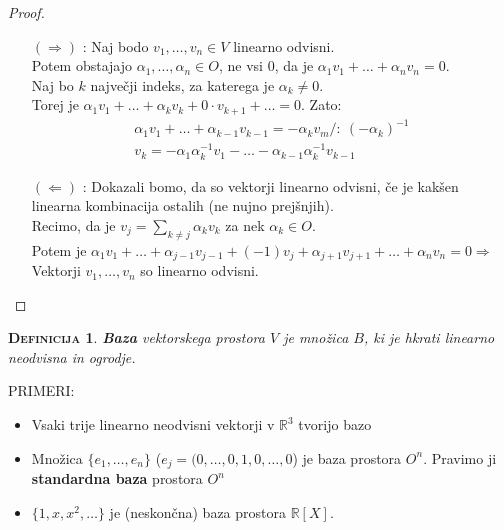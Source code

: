 \documentclass[a4paper,12pt]{article}
\newtheorem*{definicija}{\textsc{Definicija}}
\begin{document}
\begin{proof}~

\begin{itemize}
\item[$(\Rightarrow)$]:
Naj bodo $v_1,\ldots,v_n\in V$ linearno odvisni. \\

Potem obstajajo $\alpha_1,\ldots,\alpha_n\in O$, ne vsi 0, da je $\alpha_1v_1+\ldots+\alpha_nv_n=0$. \\

Naj bo $k$ največji indeks, za katerega je $\alpha_k\neq0$. \\

Torej je $\alpha_1v_1+\ldots+\alpha_kv_k+0\cdot v_{k+1}+\ldots=0$. Zato:
\begin{gather*}
\alpha_1v_1+\ldots+\alpha_{k-1}v_{k-1}=-\alpha_kv_m / :~(-\alpha_k)^{-1} \\
v_k=-\alpha_1\alpha_k^{-1}v_1-\ldots-\alpha_{k-1}\alpha_k^{-1}v_{k-1}
\end{gather*}
\item[$(\Leftarrow)$]:
Dokazali bomo, da so vektorji linearno odvisni, če je kakšen linearna kombinacija ostalih (ne nujno prejšnjih). \\

Recimo, da je $v_j=\sum_{k\neq j}\alpha_kv_k$ za nek $\alpha_k\in O$. \\

Potem je $\alpha_1v_1+\ldots+\alpha_{j-1}v_{j-1}+(-1)v_j+\alpha_{j+1}v_{j+1}+\ldots+\alpha_nv_n=0 \Rightarrow$ Vektorji $v_1,\ldots,v_n$ so linearno odvisni.
\end{itemize}
\end{proof}

\begin{definicija}
\textbf{Baza} vektorskega prostora $V$ je množica $B$, ki je hkrati linearno neodvisna in ogrodje.\\ 
\end{definicija}

\newpage 

\noindent PRIMERI:
\begin{itemize}
\item Vsaki trije linearno neodvisni vektorji v $\mathbb{R}^3$ tvorijo bazo
\item Množica $\{e_1,\ldots,e_n\}$ ($e_j=(0,\ldots,0,1,0,\ldots,0$) je baza prostora $O^n$. Pravimo ji \textbf{standardna baza} prostora $O^n$
\item $\{1,x,x^2,\ldots\}$ je (neskončna) baza prostora $\mathbb{R}[X]$.\\
\end{itemize}
\end{document}
